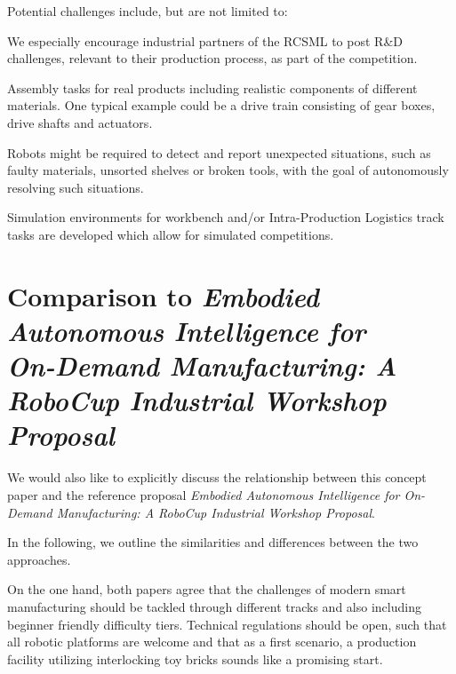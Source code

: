 \documentclass[letterpaper, 11pt]{extarticle}
\begin{document}
Potential challenges include, but are not limited to:
\begin{description}[labelwidth=\widthof{\bfseries Industry-sponsored Challenges}]
    \item[Industry-sponsored challenges] We especially encourage industrial partners of the RCSML to post R\&D challenges, relevant to their production process, as part of the competition. %
    \item[Real-product challenges] Assembly tasks for real products including realistic components of different materials. One typical example could be a drive train consisting of gear boxes, drive shafts and actuators. 
    \item[Anomaly-detection challenges] Robots might be required to detect and report unexpected situations, such as faulty materials, unsorted shelves or broken tools, with the goal of autonomously resolving such situations.
    \item[Simulation challenges] Simulation environments for workbench and/or Intra-Production Logistics track tasks are developed which allow for simulated competitions.
\end{description}


\section{Comparison to \texorpdfstring{\emph{Embodied Autonomous Intelligence for \\ On-Demand Manufacturing: A RoboCup Industrial Workshop Proposal}}{Embodied Autonomous Intelligence for On-Demand Manufacturing: A RoboCup Industrial Workshop Proposal}}

We would also like to explicitly discuss the relationship between this concept paper and the reference proposal
\emph{Embodied Autonomous Intelligence for On-Demand
Manufacturing: A RoboCup Industrial Workshop Proposal}.

In the following, we outline the similarities and differences between the two approaches.

On the one hand, both papers agree that the challenges of modern smart manufacturing should be tackled through different tracks and also including beginner friendly difficulty tiers. Technical regulations should be open, such that all robotic platforms are welcome and that as a first scenario, a production facility utilizing interlocking toy bricks sounds like a promising start.
\end{document}
